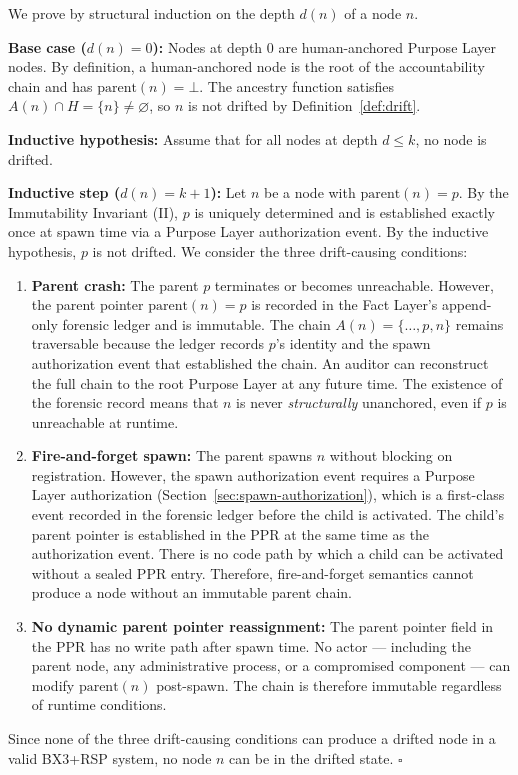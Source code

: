 \begin{Proof}
We prove by structural induction on the depth $d(n)$ of a node $n$.

\medskip
\textbf{Base case ($d(n) = 0$):} Nodes at depth $0$ are human-anchored Purpose Layer nodes. By definition, a human-anchored node is the root of the accountability chain and has $\text{parent}(n) = \bot$. The ancestry function satisfies $A(n) \cap H = \{n\} \neq \varnothing$, so $n$ is not drifted by Definition~\ref{def:drift}.

\medskip
\textbf{Inductive hypothesis:} Assume that for all nodes at depth $d \leq k$, no node is drifted.

\medskip
\textbf{Inductive step ($d(n) = k+1$):} Let $n$ be a node with $\text{parent}(n) = p$. By the Immutability Invariant (II), $p$ is uniquely determined and is established exactly once at spawn time via a Purpose Layer authorization event. By the inductive hypothesis, $p$ is not drifted. We consider the three drift-causing conditions:

\begin{enumerate}

\item \textbf{Parent crash:} The parent $p$ terminates or becomes unreachable. However, the parent pointer $\text{parent}(n) = p$ is recorded in the Fact Layer's append-only forensic ledger and is immutable. The chain $A(n) = \{\ldots, p, n\}$ remains traversable because the ledger records $p$'s identity and the spawn authorization event that established the chain. An auditor can reconstruct the full chain to the root Purpose Layer at any future time. The existence of the forensic record means that $n$ is never \emph{structurally} unanchored, even if $p$ is unreachable at runtime.

\item \textbf{Fire-and-forget spawn:} The parent spawns $n$ without blocking on registration. However, the spawn authorization event requires a Purpose Layer authorization (Section~\ref{sec:spawn-authorization}), which is a first-class event recorded in the forensic ledger before the child is activated. The child's parent pointer is established in the PPR at the same time as the authorization event. There is no code path by which a child can be activated without a sealed PPR entry. Therefore, fire-and-forget semantics cannot produce a node without an immutable parent chain.

\item \textbf{No dynamic parent pointer reassignment:} The parent pointer field in the PPR has no write path after spawn time. No actor — including the parent node, any administrative process, or a compromised component — can modify $\text{parent}(n)$ post-spawn. The chain is therefore immutable regardless of runtime conditions.

\end{enumerate}

Since none of the three drift-causing conditions can produce a drifted node in a valid BX3+RSP system, no node $n$ can be in the drifted state. $\square$
\end{Proof}


